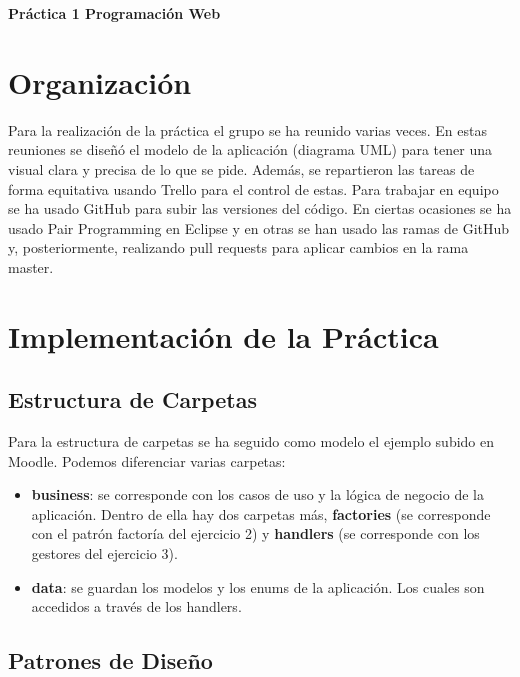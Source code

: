 \documentclass{article}
\begin{document}
	
	\begin{titlepage}
		\centering
		\vspace*{2cm}
		\vspace{1cm}
		\Huge\textbf{Práctica 1 Programación Web}
		\vfill
		\vfill
	\end{titlepage}
	
	\tableofcontents
	
	\newpage
	
	\section{Organización}
	Para la realización de la práctica el grupo se ha reunido varias veces. En estas reuniones se diseñó el modelo de la aplicación (diagrama UML) para tener una visual clara y precisa de lo que se pide. Además, se repartieron las tareas de forma equitativa usando Trello para el control de estas. Para trabajar en equipo se ha usado GitHub para subir las versiones del código. En ciertas ocasiones se ha usado Pair Programming en Eclipse y en otras se han usado las ramas de GitHub y, posteriormente, realizando pull requests para aplicar cambios en la rama master.
	
	\section{Implementación de la Práctica}
	\subsection{Estructura de Carpetas}
	Para la estructura de carpetas se ha seguido como modelo el ejemplo subido en Moodle. Podemos diferenciar varias carpetas:
	
	\begin{itemize}
		\item \textbf{business}: se corresponde con los casos de uso y la lógica de negocio de la aplicación. Dentro de ella hay dos carpetas más, \textbf{factories} (se corresponde con el patrón factoría del ejercicio 2) y \textbf{handlers} (se corresponde con los gestores del ejercicio 3).
		\item \textbf{data}: se guardan los modelos y los enums de la aplicación. Los cuales son accedidos a través de los handlers.
	\end{itemize}
	
	\subsection{Patrones de Diseño}
\end{document}
